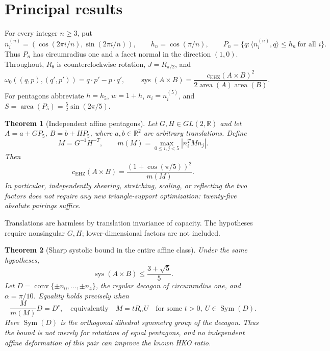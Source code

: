 \documentclass[11pt,a4paper]{article}
\newtheorem{theorem}{Theorem}[section]
\theoremstyle{definition}\newtheorem{definition}[theorem]{Definition}
\theoremstyle{remark}\newtheorem{remark}[theorem]{Remark}
\newcommand{\R}{\mathbb R}
\newcommand{\conv}{\operatorname{conv}}
\newcommand{\area}{\operatorname{area}}
\newcommand{\sys}{\operatorname{sys}}
\newcommand{\capc}{c_{\mathrm{EHZ}}}
\newcommand{\Sym}{\operatorname{Sym}}
\newcommand{\ip}[2]{\langle #1,#2\rangle}
\begin{document}
\tableofcontents

\section{Principal results}
For every integer $n\ge3$, put
\[
 n_i^{(n)}=(\cos(2\pi i/n),\sin(2\pi i/n)),\qquad
 h_n=\cos(\pi/n),\qquad
 P_n=\{q:\ip{n_i^{(n)}}q\le h_n\ \text{for all }i\}.
\]
Thus $P_n$ has circumradius one and a facet normal in the direction $(1,0)$. Throughout, $R_\theta$ is counterclockwise rotation, $J=R_{\pi/2}$, and
\[
 \omega_0((q,p),(q',p'))=q\cdot p'-p\cdot q',\qquad
 \sys(A\times B)=\frac{\capc(A\times B)^2}{2\area(A)\area(B)}.
\]
For pentagons abbreviate $h=h_5$, $w=1+h$, $n_i=n_i^{(5)}$, and $S=\area(P_5)=\frac52\sin(2\pi/5)$.

\begin{theorem}[Independent affine pentagons]\label{thm:affine}
Let $G,H\in GL(2,\R)$ and let $A=a+GP_5$, $B=b+HP_5$, where $a,b\in\R^2$ are arbitrary translations. Define
\[
 M=G^{-1}H^{-T},\qquad
 m(M)=\max_{0\le i,j<5}|n_i^T M n_j|.
\]
Then
\begin{equation}\label{eq:affine}
 \boxed{\displaystyle \capc(A\times B)=\frac{(1+\cos(\pi/5))^2}{m(M)}.}
\end{equation}
In particular, independently shearing, stretching, scaling, or reflecting the two factors does not require any new triangle-support optimization: twenty-five absolute pairings suffice.
\end{theorem}
Translations are harmless by translation invariance of capacity. The hypotheses require nonsingular $G,H$; lower-dimensional factors are not included.

\begin{theorem}[Sharp systolic bound in the entire affine class]\label{thm:sys}
Under the same hypotheses,
\begin{equation}\label{eq:sys}
 \boxed{\displaystyle \sys(A\times B)\le\frac{3+\sqrt5}{5}.}
\end{equation}
Let $D=\conv\{\pm n_0,\ldots,\pm n_4\}$, the regular decagon of circumradius one, and $\alpha=\pi/10$. Equality holds precisely when
\begin{equation}\label{eq:equality}
 \frac{M}{m(M)}D=D^\circ,
 \quad\text{equivalently}\quad
 M=tR_\alpha U\quad\text{for some }t>0,\ U\in\Sym(D).
\end{equation}
Here $\Sym(D)$ is the orthogonal dihedral symmetry group of the decagon. Thus the bound is not merely for rotations of equal pentagons, and no independent affine deformation of this pair can improve the known HKO ratio.
\end{theorem}
\end{document}
